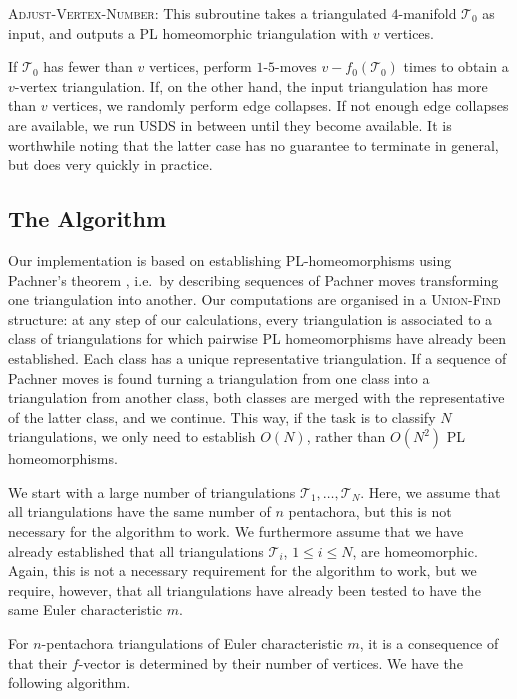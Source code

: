 \documentclass[pdflatex,sn-mathphys-num]{sn-jnl}
\theoremstyle{thmstyleone}%
\theoremstyle{thmstyletwo}%
\theoremstyle{thmstylethree}%
\newcommand{\tri}{\mathcal{T}}
\theoremstyle{remark}
\begin{document}
\textsc{Adjust-Vertex-Number}: This subroutine takes a triangulated $4$-manifold $\tri_0$ as input, and outputs a PL homeomorphic triangulation with $v$ vertices.

If $\tri_0$ has fewer than $v$ vertices, perform $1$-$5$-moves $v-f_0(\tri_0)$ times to obtain a $v$-vertex triangulation. If, on the other hand, the input triangulation has more than $v$ vertices, we randomly perform edge collapses. If not enough edge collapses are available, we run USDS in between until they become available. It is worthwhile noting that the latter case has no guarantee to terminate in general, but does very quickly in practice.

\subsection{The Algorithm}

Our implementation is based on establishing PL-homeomorphisms using Pachner's theorem \cite{pachner1987}, i.e.\ by describing sequences of Pachner moves transforming one triangulation into another. Our computations are organised in a \textsc{Union-Find} structure: at any step of our calculations, every triangulation is associated to a class of triangulations for which pairwise PL homeomorphisms have already been established. Each class has a unique representative triangulation. If a sequence of Pachner moves is found turning a triangulation from one class into a triangulation from another class, both classes are merged with the representative of the latter class, and we continue. This way, if the task is to classify $N$ triangulations, we only need to establish $O(N)$, rather than $O(N^2)$ PL homeomorphisms.

We start with a large number of triangulations $\tri_1, \ldots , \tri_N$. Here, we assume that all triangulations have the same number of $n$ pentachora, but this is not necessary for the algorithm to work. We furthermore assume that we have already established that all triangulations $\tri_i$, $1 \leq i \leq N$, are homeomorphic. Again, this is not a necessary requirement for the algorithm to work, but we require, however, that all triangulations have already been tested to have the same Euler characteristic $m$.

For $n$-pentachora triangulations of Euler characteristic $m$, it is a consequence of  that their $f$-vector is determined by their number of vertices. We have the following algorithm.
\end{document}
